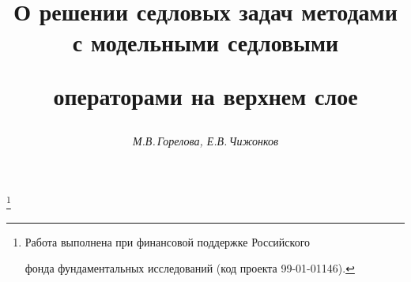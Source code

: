 




%


\def\zg{\gamma}


\def\zG{\Gamma}


\def\za{\alpha}


\def\zL{\Lambda}


\def\zD{\Delta}


\def\zd{\delta}


\def\zl{\lambda}


\def\zp{\varphi}


\newcommand{\cond}{\operatorname{cond}}


\def\kpp{\varkappa}


\newcommand{\tts}[1]{}







\setcounter{page}{19}















\author{\it М.В.\,Горелова, Е.В.\,Чижонков}




\title{О решении седловых задач методами с модельными седловыми


операторами на верхнем слое}


\thanks{Работа выполнена при финансовой поддержке Российского 


фонда фундаментальных исследований (код проекта 99-01-01146).}





\date{}


